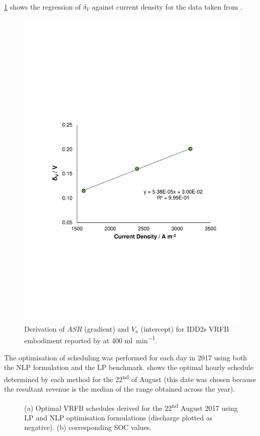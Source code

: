 \documentclass[preprint,3p,review,authoryear,10pt]{elsarticle}
\begin{document}
\cref{fig:Va_ASR_Derivation} shows the regression of $\delta_V$ against current density for the data taken from \cite{Reed2016}.

\begin{figure}[!ht]
\centering
\includegraphics[trim = 2cm 8cm 2cm 9cm, clip, width = .5\textwidth]{./ASR_deriv.pdf}
\caption{Derivation of $ASR$ (gradient) and $V_a$ (intercept) for IDD2s VRFB embodiment reported by \cite{Reed2016} at 400 \si{\ml\per\minute}.}
\label{fig:Va_ASR_Derivation}
\end{figure}

The optimisation of scheduling was performed for each day in 2017 using both the NLP formulation and the LP benchmark.  shows the optimal hourly schedule determined by each method for the 22\textsuperscript{nd} of August (this date was chosen because the resultant revenue is the median of the range obtained across the year).

\begin{figure}[!ht]
\centering
{}
\caption{(a) Optimal VRFB schedules derived for the 22\textsuperscript{nd} August 2017 using LP and NLP optimisation formulations (discharge plotted as negative). (b) corresponding SOC values.}
\end{figure}
\end{document}
